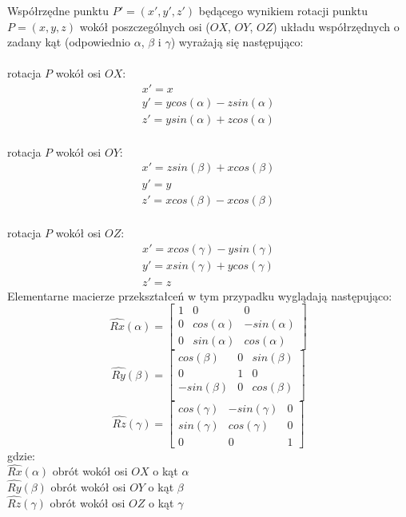 \documentclass[licencjacka]{pracamgr}
\begin{document}
Współrzędne punktu $P'=(x',y',z')$ będącego wynikiem rotacji punktu $P=(x,y,z)$ wokół poszczególnych osi ($OX$, $OY$, $OZ$) układu współrzędnych o zadany kąt (odpowiednio $\alpha$, $\beta$ i $\gamma$) wyrażają się następująco:
\\
\\
rotacja $P$ wokół osi $OX$:
$$
\begin{array}{lr}
x'=x \\
y'=ycos(\alpha)-zsin(\alpha) \\
z'=ysin(\alpha)+zcos(\alpha)
\end{array}
$$
\\
rotacja $P$ wokół osi $OY$:
$$
\begin{array}{lr}
x'=zsin(\beta)+xcos(\beta) \\
y'=y \\
z'=xcos(\beta)-xcos(\beta)
\end{array}
$$
\\
rotacja $P$ wokół osi $OZ$:
$$
\begin{array}{lr}
x'=xcos(\gamma)-ysin(\gamma) \\
y'=xsin(\gamma)+ycos(\gamma) \\
z'=z
\end{array}
$$
Elementarne macierze przekształceń w tym przypadku wyglądają następująco:
$$
\hat{Rx}(\alpha)
=
\begin{bmatrix}
1 & 0 & 0 \\
0 & cos(\alpha) & -sin(\alpha) \\
0 & sin(\alpha) & cos(\alpha)
\end{bmatrix}
$$
$$
\hat{Ry}(\beta)
=
\begin{bmatrix}
cos(\beta) & 0 & sin(\beta) \\
0 & 1 & 0 \\
-sin(\beta) & 0 & cos(\beta) \\
\end{bmatrix}
$$
$$
\hat{Rz}(\gamma)
=
\begin{bmatrix}
cos(\gamma) & -sin(\gamma) & 0 \\
sin(\gamma) & cos(\gamma) & 0 \\
0 & 0 & 1
\end{bmatrix}
$$
gdzie:
\\
$\hat{Rx}(\alpha)$ obrót wokół osi $OX$ o kąt $\alpha$
\\
$\hat{Ry}(\beta)$ obrót wokół osi $OY$ o kąt $\beta$
\\
$\hat{Rz}(\gamma)$ obrót wokół osi $OZ$ o kąt $\gamma$
\\
\end{document}
